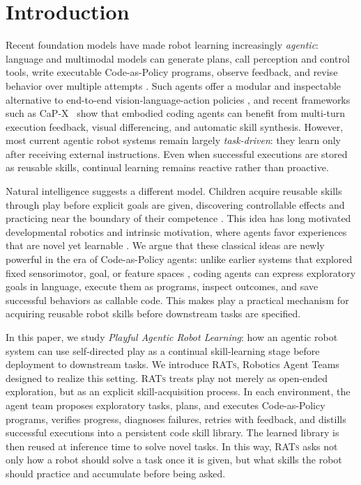 



\section{Introduction}
\label{sec:introduction}

Recent foundation models have made robot learning increasingly \emph{agentic}: language and multimodal models can generate plans, call perception and control tools, write executable Code-as-Policy programs, observe feedback, and revise behavior over multiple attempts \citep{liang2023code, singh2023progprompt, vemprala2024chatgpt}. Such agents offer a modular and inspectable alternative to end-to-end vision-language-action policies \citep{zitkovich2023rt2, black2025pi0, physicalintelligence2025pi05}, and recent frameworks such as CaP-X~\citep{fu2026capx} show that embodied coding agents can benefit from multi-turn execution feedback, visual differencing, and automatic skill synthesis. 
However, most current agentic robot systems remain largely \emph{task-driven}: they learn only after receiving external instructions. Even when successful executions are stored as reusable skills, continual learning remains reactive rather than proactive.

Natural intelligence suggests a different model. Children acquire reusable skills through play before explicit goals are given, discovering controllable effects and practicing near the boundary of their competence \citep{piaget1952origins, gopnik2020childhood, smith2005developmental}. This idea has long motivated developmental robotics and intrinsic motivation, where agents favor experiences that are novel yet learnable \citep{schmidhuber1991curious, oudeyer2007intrinsic, baranes2013active, forestier2016modular}. We argue that these classical ideas are newly powerful in the era of Code-as-Policy agents: unlike earlier systems that explored fixed sensorimotor, goal, or feature spaces \citep{oudeyer2007intrinsic, baranes2013active, pathak2017curiosity, houthooft2016vime}, coding agents can express exploratory goals in language, execute them as programs, inspect outcomes, and save successful behaviors as callable code. This makes play a practical mechanism for acquiring reusable robot skills before downstream tasks are specified.

In this paper, we study \emph{Playful Agentic Robot Learning}: how an agentic robot system can use self-directed play as a continual skill-learning stage before deployment to downstream tasks. 
We introduce \textsc{RATs}, Robotics Agent Teams designed to realize this setting. \textsc{RATs} treats play not merely as open-ended exploration, but as an explicit skill-acquisition process. 
In each environment, the agent team proposes exploratory tasks, plans, and executes Code-as-Policy programs, verifies progress, diagnoses failures, retries with feedback, and distills successful executions into a persistent code skill library. 
The learned library is then reused at inference time to solve novel tasks. In this way, \textsc{RATs} asks not only how a robot should solve a task once it is given, but what skills the robot should practice and accumulate before being asked.

